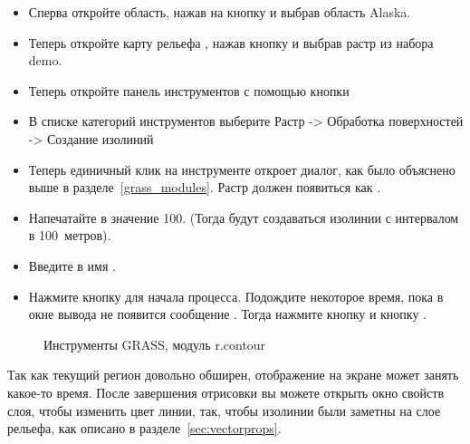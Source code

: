 \begin{itemize}[label=--]
\item Сперва откройте область, нажав на кнопку
 и выбрав область Alaska.
\item Теперь откройте карту рельефа , нажав кнопку
 и
выбрав растр  из набора demo.
\item Теперь откройте панель инструментов с помощью кнопки
\item В списке категорий инструментов выберите Растр -> Обработка
поверхностей -> Создание изолиний
\item Теперь единичный клик на инструменте 
откроет диалог, как было объяснено выше в разделе~\ref{grass_modules}.
Растр  должен появиться как
.
\item Напечатайте в 
значение 100. (Тогда будут создаваться изолинии с интервалом в
100~метров).
\item Введите в 
имя .
\item Нажмите кнопку  для начала процесса. Подождите
некоторое время, пока в окне вывода не появится сообщение
. Тогда нажмите кнопку
 и кнопку .
\end{itemize}

\begin{figure}[ht]
\centering
    \hspace{0.5cm}
   \caption{\grass Инструменты GRASS, модуль r.contour \wincaption}\label{fig:grass_toolbox_rcontour}
\end{figure}


Так как текущий регион довольно обширен, отображение на экране может
занять какое-то время. После завершения отрисовки вы можете открыть окно
свойств слоя, чтобы изменить цвет линии, так, чтобы изолинии были заметны
на слое рельефа, как описано в разделе~\ref{sec:vectorprops}.

